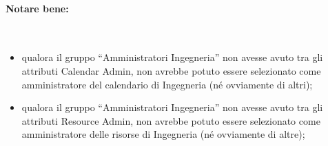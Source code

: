 \paragraph*{Notare bene:}\mbox{}\\ %
\begin{itemize}
 \item qualora il gruppo ``Amministratori Ingegneria'' non avesse avuto tra gli attributi Calendar Admin, non avrebbe potuto
essere selezionato come amministratore del calendario di Ingegneria (né ovviamente di altri);
\item qualora il gruppo ``Amministratori Ingegneria'' non avesse avuto tra gli attributi Resource Admin, non avrebbe potuto
essere selezionato come amministratore delle risorse di Ingegneria (né ovviamente di altre);
\end{itemize}